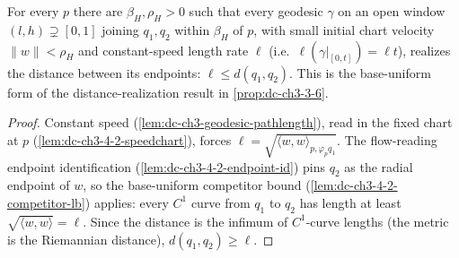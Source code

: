 \begin{lemma}
  \label{lem:dc-ch3-4-2-lowerbound}


  For every $p$ there are $\beta_H,\rho_H>0$ such that every geodesic $\gamma$ on an open window
  $(l,h)\supsetneq[0,1]$ joining $q_1,q_2$ within $\beta_H$ of $p$, with small initial chart velocity
  $\|w\|<\rho_H$ and constant-speed length rate $\ell$ (i.e.\ $\ell(\gamma|_{[0,t]})=\ell t$), realizes
  the distance between its endpoints: $\ell\le d(q_1,q_2)$. This is the
  base-uniform form of the distance-realization result in
  \cref{prop:dc-ch3-3-6}.
\end{lemma}
\begin{proof}
  \sketch

  Constant speed (\cref{lem:dc-ch3-geodesic-pathlength}), read in the fixed chart at $p$
  (\cref{lem:dc-ch3-4-2-speedchart}), forces $\ell=\sqrt{\langle w,w\rangle_{p,\varphi_p q_1}}$. The
  flow-reading endpoint identification (\cref{lem:dc-ch3-4-2-endpoint-id}) pins $q_2$ as the radial
  endpoint of $w$, so the base-uniform competitor bound (\cref{lem:dc-ch3-4-2-competitor-lb}) applies:
  every $C^1$ curve from $q_1$ to $q_2$ has length at least $\sqrt{\langle w,w\rangle}=\ell$. Since the
  distance is the infimum of $C^1$-curve lengths (the metric is the Riemannian distance),
  $d(q_1,q_2)\ge\ell$.
\end{proof}

